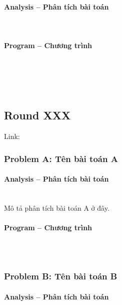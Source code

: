 \paragraph{Analysis -- Phân tích bài toán} \mbox{} \\



\paragraph{Program -- Chương trình} \mbox{} \\


\begin{lstlisting}
	
	
\end{lstlisting}
\subsection{Round XXX}
Link: \url{}

\subsubsection{Problem A: Tên bài toán A}

\paragraph{Analysis -- Phân tích bài toán} \mbox{} \\

Mô tả phân tích bài toán A ở đây.

\paragraph{Program -- Chương trình} \mbox{} \\

\begin{lstlisting}

\end{lstlisting}

\subsubsection{Problem B: Tên bài toán B}

\paragraph{Analysis -- Phân tích bài toán} \mbox{} \\

